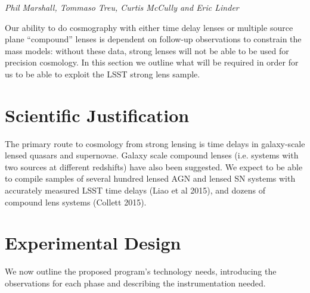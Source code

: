 

\label{chap:sl}

{\it Phil Marshall, Tommaso Treu, Curtis McCully and Eric Linder}


Our ability to do cosmography with either time delay lenses or multiple
source plane ``compound'' lenses is dependent on follow-up observations
to constrain the mass models: without these data, strong lenses will not
be able to be used for precision cosmology. In this section we outline what will be
required in order for us to be able to exploit the LSST strong lens sample.


\section{Scientific Justification}
\label{sec:sl_just}

The primary route to cosmology from strong lensing is time delays in
galaxy-scale lensed quasars and supernovae. Galaxy scale compound lenses
(i.e. systems with two sources at different redshifts) have also been
suggested. We expect to be able to compile samples of several hundred lensed AGN
and lensed SN systems with accurately measured LSST time delays (Liao et al 2015),
and dozens of compound lens systems (Collett 2015).


\section{Experimental Design}
\label{sec:sl_design}

We now outline the proposed program's technology needs, introducing the
observations for each phase and describing the  instrumentation needed.

